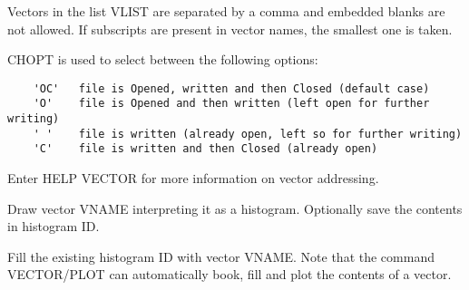    \par
Vectors in the list VLIST are separated by a comma and embedded blanks are 
   not allowed. If subscripts are present in vector names, the smallest one is 
   taken.  

   \par
CHOPT is used to select between the following options:  
\begin{verbatim}
    'OC'   file is Opened, written and then Closed (default case)
    'O'    file is Opened and then written (left open for further writing)
    ' '    file is written (already open, left so for further writing)
    'C'    file is written and then Closed (already open)
\end{verbatim}
   \par
Enter HELP VECTOR for more information on vector addressing.  

\ENDCMD


\BEGARG
{}
\ENDARG
{}
\ENDOPT

   \par
Draw vector VNAME interpreting it as a histogram.  Optionally save the 
   contents in histogram ID.  

\ENDCMD


\BEGARG
{}
\ENDARG

   \par
Fill the existing histogram ID with vector VNAME.  Note that the command 
   VECTOR/PLOT can automatically book, fill and plot the contents of a vector. 

